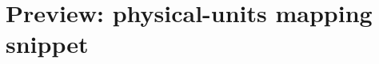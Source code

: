 \documentclass[aps,physrev,reprint,amsmath,amssymb,floatfix]{revtex4-2}
\begin{document}
\section*{Preview: physical-units mapping snippet}

\end{document}

